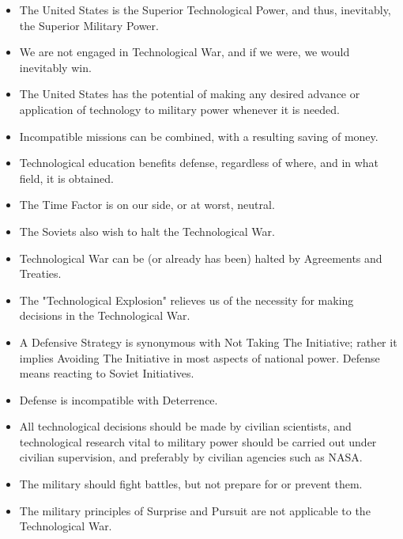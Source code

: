 \begin{mdframed}[nobreak=true, frametitle={CHART THREE: Assumptions Governing U.S. Technological Strategy}]
        \begin{itemize}
            \item The United States is the Superior Technological Power, and thus, inevitably, the Superior Military Power.
            \item We are not engaged in Technological War, and if we were, we would inevitably win.
            \item The United States has the potential of making any desired advance or application of technology to military power whenever it is needed.
            \item Incompatible missions can be combined, with a resulting saving of money.
            \item Technological education benefits defense, regardless of where, and in what field, it is obtained.
            \item The Time Factor is on our side, or at worst, neutral.
            \item The Soviets also wish to halt the Technological War.
            \item Technological War can be (or already has been) halted by Agreements and Treaties.
            \item The "Technological Explosion" relieves us of the necessity for making decisions in the Technological War.
            \item A Defensive Strategy is synonymous with Not Taking The Initiative; rather it implies Avoiding The Initiative in most aspects of national power. Defense means reacting to Soviet Initiatives.
            \item Defense is incompatible with Deterrence.
            \item All technological decisions should be made by civilian scientists, and technological research vital to military power should be carried out under civilian supervision, and preferably by civilian agencies such as NASA.
            \item The military should fight battles, but not prepare for or prevent them.
            \item The military principles of Surprise and Pursuit are not applicable to the Technological War.
        \end{itemize}
\end{mdframed}   

\medskip

